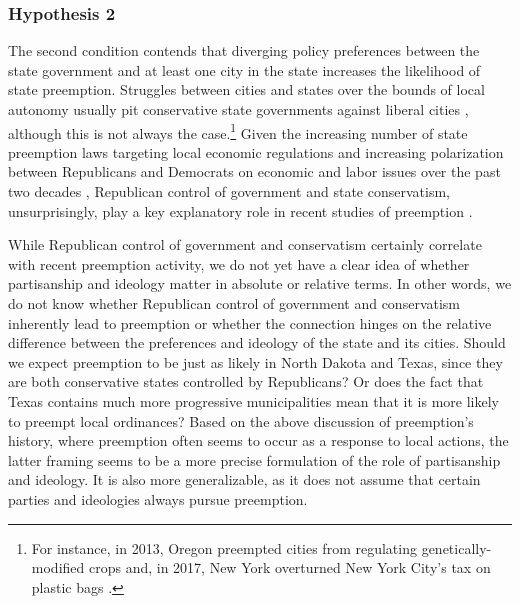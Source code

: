 \documentclass[12pt]{article}
\begin{document}
\subsubsection*{Hypothesis 2}
The second condition contends that diverging policy preferences between the state government and at least one city in the state increases the likelihood of state preemption. Struggles between cities and states over the bounds of local autonomy usually pit conservative state governments against liberal cities \parencite{rapoportBlueCitiesBattle2016,riverstone-newellRiseStatePreemption2017}, although this is not always the case.\footnote{For instance, in 2013, Oregon preempted cities from regulating genetically-modified crops and, in 2017, New York overturned New York City's tax on plastic bags \parencite{mckinleyCuomoBlocksNew2017,scharffHyperPreemptionReordering2018}.} Given the increasing number of state preemption laws targeting local economic regulations and increasing polarization between Republicans and Democrats on economic and labor issues over the past two decades \parencite{grumbachBackwatersMajorPolicymakers2018}, Republican control of government and state conservatism, unsurprisingly, play a key explanatory role in recent studies of preemption \parencite{hicksHomeRuleBe2018,riverstone-newellRiseStatePreemption2017,flavinExplainingStatePreemption2019,fowlerStatePreemptionLocal2019}. 

While Republican control of government and conservatism certainly correlate with recent preemption activity, we do not yet have a clear idea of whether partisanship and ideology matter in absolute or relative terms. In other words, we do not know whether Republican control of government and conservatism inherently lead to preemption or whether the connection hinges on the relative difference between the preferences and ideology of the state and its cities. Should we expect preemption to be just as likely in North Dakota and Texas, since they are both conservative states controlled by Republicans? Or does the fact that Texas contains much more progressive municipalities mean that it is more likely to preempt local ordinances? Based on the above discussion of preemption's history, where preemption often seems to occur as a response to local actions, the latter framing seems to be a more precise formulation of the role of partisanship and ideology. It is also more generalizable, as it does not assume that certain parties and ideologies always pursue preemption. 
\end{document}
